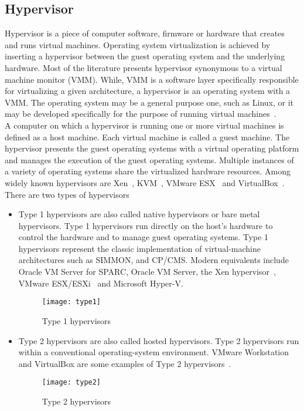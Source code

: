 \subsection{Hypervisor}
Hypervisor is a piece of computer software, firmware or hardware that creates and runs virtual machines. Operating system virtualization is achieved by inserting a hypervisor between the guest operating system and the underlying hardware. Most of the literature presents hypervisor synonymous to a virtual machine monitor (VMM). While, VMM is a software layer specifically responsible for virtualizing a given architecture, a hypervisor is an operating system with a VMM. The operating system may be a general purpose one, such as Linux, or it may be developed specifically for the purpose of running virtual machines~\cite{Agesen:2010:EXV:1899928.1899930}.
\\[3mm]
A computer on which a hypervisor is running one or more virtual machines is defined as a host machine. Each virtual machine is called a guest machine. The hypervisor presents the guest operating systems with a virtual operating platform and manages the execution of the guest operating systems. Multiple instances of a variety of operating systems share the virtualized hardware resources. Among widely known hypervisors are Xen~\cite{barham2003xen, Chisnall:2007:DGX:1407351}, KVM~\cite{Habib:2008:VK:1344209.1344217, kivity2007kvm}, VMware ESX~\cite{Agesen:2010:EXV:1899928.1899930} and VirtualBox~\cite{camargos2008virtualization}.
\\[3mm]
There are two types of hypervisors~\cite{Goldberg:1973:AVM:800122.803950}
\begin{itemize}
\item Type 1 hypervisors are also called native hypervisors or bare metal hypervisors. Type 1 hypervisors run directly on the host's hardware to control the hardware and to manage guest operating systems. Type 1 hypervisors represent the classic implementation of virtual-machine architectures such as SIMMON, and CP/CMS. Modern equivalents include Oracle VM Server for SPARC, Oracle VM Server, the Xen hypervisor~\cite{barham2003xen}, VMware ESX/ESXi~\cite{Agesen:2010:EXV:1899928.1899930} and Microsoft Hyper-V.
\begin{figure}[!ht]
\centering
\texttt{[image: type1]}
\caption{Type 1 hypervisors}
\label{Type 1 hypervisor}
\end{figure}
\item Type 2 hypervisors are also called hosted hypervisors. Type 2 hypervisors run within a conventional operating-system environment. VMware Workstation and VirtualBox are some examples of Type 2 hypervisors~\cite{Sugerman:2001:VID:647055.715774, camargos2008virtualization}.
\begin{figure}[!ht]
\centering
\texttt{[image: type2]}
\caption{Type 2 hypervisors}
\label{fig:Type 2 hypervisor}
\end{figure}
\end{itemize}

